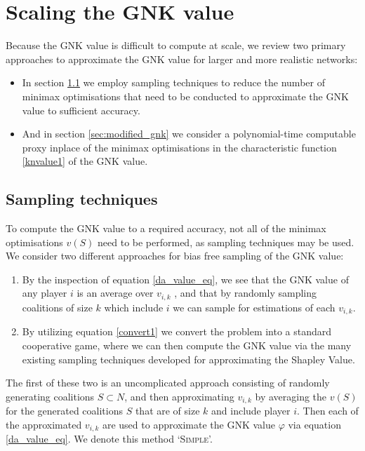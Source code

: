 \section{Scaling the GNK value}\label{sec:scaling}

Because the GNK value is difficult to compute at scale, we review two primary approaches to approximate the GNK value for larger and more realistic networks:

\begin{itemize}
    \item In section \ref{sec:sampling_techniques} we employ sampling techniques to reduce the number of minimax optimisations that need to be conducted to approximate the GNK value to sufficient accuracy.
    \item And in section \ref{sec:modified_gnk} we consider a polynomial-time computable proxy inplace of the minimax optimisations in the characteristic function \eqref{knvalue1} of the GNK value.
\end{itemize}

\subsection{Sampling techniques}\label{sec:sampling_techniques}
To compute the GNK value to a required accuracy, not all of the minimax optimisations $v(S)$ need to be performed, as sampling techniques may be used.
We consider two different approaches for bias free sampling of the GNK value:
\begin{enumerate}
    \item By the inspection of equation \ref{da_value_eq}, we see that the GNK value of any player $i$ is an average over $v_{i,k}$%
, and that by randomly sampling coalitions of size $k$ which include $i$ we can sample for estimations of each $v_{i,k}$.
    \item By utilizing equation \ref{convert1} we convert the problem into a standard cooperative game, where we can then compute the GNK value via the many existing sampling techniques developed for approximating the Shapley Value.
\end{enumerate}

The first of these two is an uncomplicated approach consisting of randomly generating coalitions $S\subset N$, %
and then approximating $v_{i,k}$ by averaging the $v(S)$ for the generated coalitions $S$ that are of size $k$ and include player $i$.
Then each of the approximated $v_{i,k}$ are used to approximate the GNK value $\varphi$ via equation \ref{da_value_eq}. We denote this method `\textsc{Simple}'.

